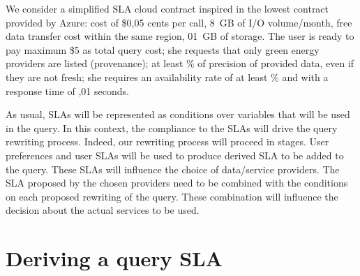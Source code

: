 We consider a simplified SLA cloud contract inspired in the lowest contract provided by Azure: {\sf cost of \$0,05 cents per call,  8~GB of I/O volume/month, free data transfer cost within the same region,  01~GB of storage}. 
The user is ready to pay maximum {\sf \$5 as total query cost}; she requests that only {\sf green} energy providers are listed (provenance); at least {$\%$} of precision of provided data, even if they are not fresh; she requires an availability rate of at least {$\%$} and with a response time of {,01 seconds}.
 
As usual, SLAs will be represented as conditions over variables that will be used in the query.
In this context, the compliance to the SLAs will drive the query rewriting process.
Indeed, our rewriting process will proceed in stages.
User preferences and user SLAs will be used to produce derived SLA to be added to the query. 
These SLAs will influence the choice of data/service providers.
The SLA proposed by the chosen providers need to be combined with the conditions on each proposed rewriting of the query.
These combination will influence the decision about the actual services to be used.



\section{Deriving a query SLA}
\label{sec:slaModel}

%

